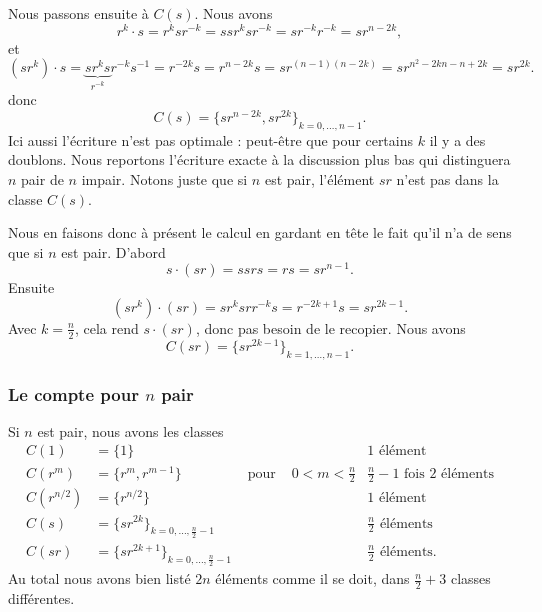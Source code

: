 Nous passons ensuite à \( C(s)\). Nous avons
\begin{equation}
    r^k\cdot s=r^ksr^{-k}=ssr^ksr^{-k}=sr^{-k}r^{-k}=sr^{n-2k},
\end{equation}
et
\begin{equation}
    (sr^k)\cdot s=\underbrace{sr^ks}_{r^{-k}}r^{-k}s^{-1}=r^{-2k}s=r^{n-2k}s=sr^{(n-1)(n-2k)}=sr^{n^2-2kn-n+2k}=sr^{2k}.
\end{equation}
donc
\begin{equation}
    C(s)=\{ sr^{n-2k},sr^{2k} \}_{k=0,\ldots, n-1}.
\end{equation}
Ici aussi l'écriture n'est pas optimale : peut-être que pour certains \( k\) il y a des doublons. Nous reportons l'écriture exacte à la discussion plus bas qui distinguera \( n\) pair de \( n\) impair. Notons juste que si \( n\) est pair, l'élément \( sr\) n'est pas dans la classe \( C(s)\).

Nous en faisons donc à présent le calcul en gardant en tête le fait qu'il n'a de sens que si \( n\) est pair. D'abord
\begin{equation}
    s\cdot (sr)=ssrs=rs=sr^{n-1}.
\end{equation}
Ensuite
\begin{equation}
    (sr^k)\cdot (sr)=sr^ksrr^{-k}s=r^{-2k+1}s=sr^{2k-1}.
\end{equation}
Avec \( k=\frac{ n }{2}\), cela rend \( s\cdot (sr)\), donc pas besoin de le recopier. Nous avons
\begin{equation}
    C(sr)=\{ sr^{2k-1} \}_{k=1,\ldots, n-1}.
\end{equation}

\subsubsection{Le compte pour $ n$ pair}
\label{SubsubsecROVmHuM}

Si \( n\) est pair, nous avons les classes
\begin{subequations}
    \begin{align}
        C(1)&=\{ 1 \}       &&& 1\text{ élément}\\
        C(r^m)&=\{ r^m,r^{m-1} \}&\text{ pour }&0<m<\frac{ n }{2}   & \frac{ n }{2}-1\text{ fois } 2\text{ éléments}\\
        C(r^{n/2})&=\{ r^{n/2} \}   &&&  1\text{ élément}\\
        C(s)&=\{ sr^{2k} \}_{k=0,\ldots, \frac{ n }{2}-1} &&&  \frac{ n }{2}\text{ éléments}\\
        C(sr)&=\{ sr^{2k+1} \}_{k=0,\ldots, \frac{ n }{2}-1} &&&  \frac{ n }{2}\text{ éléments}.
    \end{align}
\end{subequations}
Au total nous avons bien listé \( 2n\) éléments comme il se doit, dans \(  \frac{ n }{2}+3\) classes différentes.

